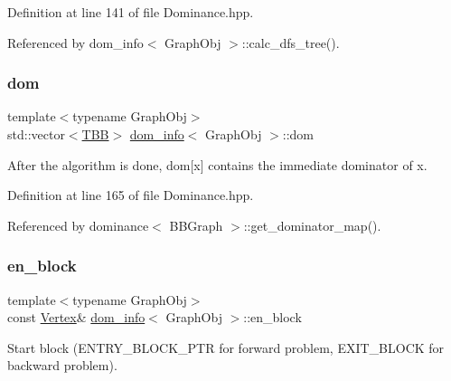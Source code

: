 Definition at line 141 of file Dominance.\+hpp.



Referenced by dom\+\_\+info$<$ Graph\+Obj $>$\+::calc\+\_\+dfs\+\_\+tree().

\mbox{\label{classdom__info_a60f3c6b06eac40aa2462bfa7c473772a}} 
\subsubsection{\texorpdfstring{dom}{dom}}
{\footnotesize\ttfamily template$<$typename Graph\+Obj$>$ \\
std\+::vector$<$\hyperlink{Dominance_8hpp_ac35ffd4ddeccae8225d6ec6f55d65a97}{T\+BB}$>$ \hyperlink{classdom__info}{dom\+\_\+info}$<$ Graph\+Obj $>$\+::dom\hspace{0.3cm}{\ttfamily [private]}}



After the algorithm is done, dom\mbox{[}x\mbox{]} contains the immediate dominator of x. 



Definition at line 165 of file Dominance.\+hpp.



Referenced by dominance$<$ B\+B\+Graph $>$\+::get\+\_\+dominator\+\_\+map().

\mbox{\label{classdom__info_a7f31774036bc8d3385e5f85c087d798f}} 
\subsubsection{\texorpdfstring{en\+\_\+block}{en\_block}}
{\footnotesize\ttfamily template$<$typename Graph\+Obj$>$ \\
const \hyperlink{classdom__info_a5e4ca21e2c5281bdbb95d2c8d965c9be}{Vertex}\& \hyperlink{classdom__info}{dom\+\_\+info}$<$ Graph\+Obj $>$\+::en\+\_\+block\hspace{0.3cm}{\ttfamily [private]}}



Start block (E\+N\+T\+R\+Y\+\_\+\+B\+L\+O\+C\+K\+\_\+\+P\+TR for forward problem, E\+X\+I\+T\+\_\+\+B\+L\+O\+CK for backward problem). 



